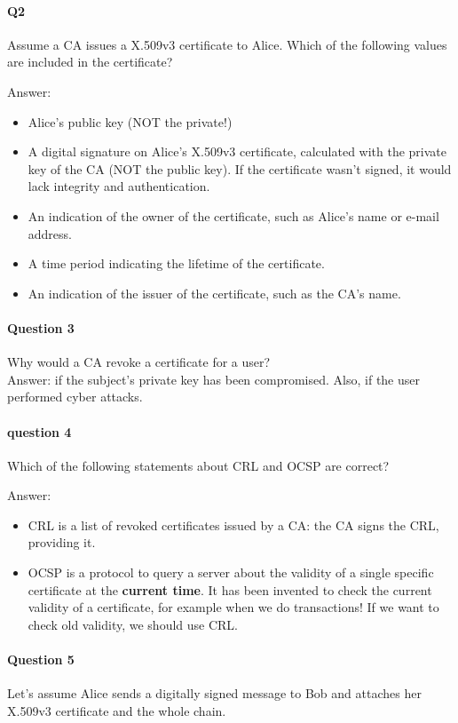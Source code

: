 \paragraph{Q2}
Assume a CA issues a X.509v3 certificate to Alice. Which of the following values are included in the certificate?

Answer:
\begin{itemize}
    \item Alice's public key (NOT the private!)
    \item A digital signature on Alice's X.509v3 certificate, calculated with the private key of the CA (NOT the public key). If the certificate wasn't signed, it would lack integrity and authentication.
    \item An indication of the owner of the certificate, such as Alice's name or e-mail address.
    \item A time period indicating the lifetime of the certificate.
    \item An indication of the issuer of the certificate, such as the CA's name.
\end{itemize}

\paragraph{Question 3}
Why would a CA revoke a certificate for a user?\\
Answer: if the subject's private key has been compromised. Also, if the user performed cyber attacks.

\paragraph{question 4}
Which of the following statements about CRL and OCSP are correct?

Answer:
\begin{itemize}
    \item CRL is a list of revoked certificates issued by a CA: the CA signs the CRL, providing it.

    \item OCSP is a protocol to query a server about the validity of a  single specific certificate at the \textbf{current time}. It has been invented to check the current validity of a certificate, for example when we do transactions! If we want to check old validity, we should use CRL.
\end{itemize}

\paragraph{Question 5}
Let's assume Alice sends a digitally signed message to Bob and attaches her X.509v3 certificate and the whole chain.

